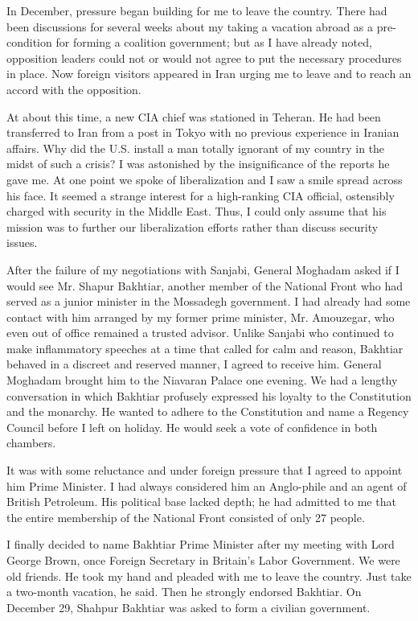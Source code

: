 In December, pressure began building for me to leave the country. There had been discussions for several weeks about my taking a vacation abroad as a pre-condition for forming a coalition government; but as I have already noted, opposition leaders could not or would not agree to put the necessary procedures in place. Now foreign visitors appeared in Iran urging me to leave and to reach an accord with the opposition. 

At about this time, a new CIA chief was stationed in Teheran. He had been transferred to Iran from a post in Tokyo with no previous experience in Iranian affairs. Why did the U.S. install a man totally ignorant of my country in the midst of such a crisis? I was astonished by the insignificance of the reports he gave me. At one point we spoke of liberalization and I saw a smile spread across his face. It seemed a strange interest for a high-ranking CIA official, ostensibly charged with security in the Middle East. Thus, I could only assume that his mission was to further our liberalization efforts rather than discuss security issues. 

After the failure of my negotiations with Sanjabi, General Moghadam asked if I would see Mr. Shapur Bakhtiar, another member of the National Front who had served as a junior minister in the Mossadegh government. I had already had some contact with him arranged by my former prime minister, Mr. Amouzegar, who even out of office remained a trusted advisor. Unlike Sanjabi who continued to make inflammatory speeches at a time that called for calm and reason, Bakhtiar behaved in a discreet and reserved manner, I agreed to receive him. General Moghadam brought him to the Niavaran Palace one evening. We had a lengthy conversation in which Bakhtiar profusely expressed his loyalty to the Constitution and the monarchy. He wanted to adhere to the Constitution and name a Regency Council before I left on holiday. He would seek a vote of confidence in both chambers. 

It was with some reluctance and under foreign pressure that I agreed to appoint him Prime Minister. I had always considered him an Anglo-phile and an agent of British Petroleum. His political base lacked depth; he had admitted to me that the entire membership of the National Front consisted of only 27 people. 

I finally decided to name Bakhtiar Prime Minister after my meeting with Lord George Brown, once Foreign Secretary in Britain's Labor Government. We were old friends. He took my hand and pleaded with me to leave the country. Just take a two-month vacation, he said. Then he strongly endorsed Bakhtiar. On December 29, Shahpur Bakhtiar was asked to form a civilian government. 

